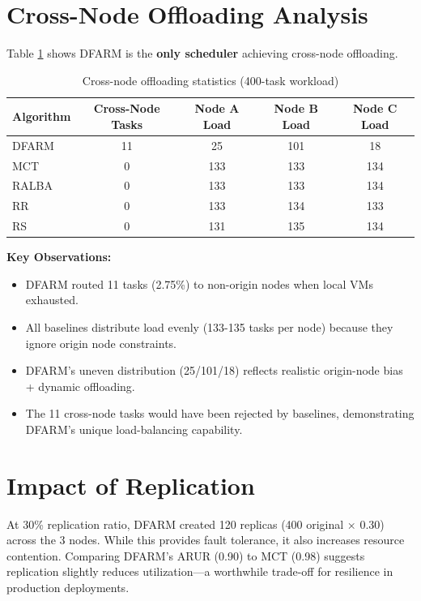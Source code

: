 \documentclass[12pt]{report}
\begin{document}
\section{Cross-Node Offloading Analysis}

Table \ref{tab:crossnode} shows DFARM is the \textbf{only scheduler} achieving cross-node offloading.

\begin{table}[H]
\centering
\caption{Cross-node offloading statistics (400-task workload)}
\label{tab:crossnode}
\begin{tabular}{lcccc}
\toprule
\textbf{Algorithm} & \textbf{Cross-Node Tasks} & \textbf{Node A Load} & \textbf{Node B Load} & \textbf{Node C Load} \\
\midrule
DFARM & 11 & 25 & 101 & 18 \\
MCT & 0 & 133 & 133 & 134 \\
RALBA & 0 & 133 & 133 & 134 \\
RR & 0 & 133 & 134 & 133 \\
RS & 0 & 131 & 135 & 134 \\
\bottomrule
\end{tabular}
\end{table}

\textbf{Key Observations:}
\begin{itemize}
    \item DFARM routed 11 tasks (2.75\%) to non-origin nodes when local VMs exhausted.
    \item All baselines distribute load evenly (133-135 tasks per node) because they ignore origin node constraints.
    \item DFARM's uneven distribution (25/101/18) reflects realistic origin-node bias + dynamic offloading.
    \item The 11 cross-node tasks would have been rejected by baselines, demonstrating DFARM's unique load-balancing capability.
\end{itemize}

\section{Impact of Replication}

At 30\% replication ratio, DFARM created 120 replicas (400 original × 0.30) across the 3 nodes. While this provides fault tolerance, it also increases resource contention. Comparing DFARM's ARUR (0.90) to MCT (0.98) suggests replication slightly reduces utilization—a worthwhile trade-off for resilience in production deployments.
\end{document}
